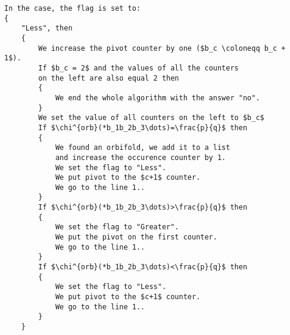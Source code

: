 \begin{lstlisting}[firstnumber=1,consecutivenumbers=true]
In the case, the flag is set to: 
{
    "Less", then 
    {
        We increase the pivot counter by one ($b_c \coloneqq b_c + 1$).
        If $b_c = 2$ and the values of all the counters 
        on the left are also equal 2 then 
        {
            We end the whole algorithm with the answer "no".
        }
        We set the value of all counters on the left to $b_c$
        If $\chi^{orb}(*b_1b_2b_3\dots)=\frac{p}{q}$ then
        {
            We found an orbifold, we add it to a list 
            and increase the occurence counter by 1. 
            We set the flag to "Less".
            We put pivot to the $c+1$ counter.
            We go to the line 1..
        }
        If $\chi^{orb}(*b_1b_2b_3\dots)>\frac{p}{q}$ then  
        {
            We set the flag to "Greater".
            We put the pivot on the first counter. 
            We go to the line 1..
        } 
        If $\chi^{orb}(*b_1b_2b_3\dots)<\frac{p}{q}$ then
        {
            We set the flag to "Less".
            We put pivot to the $c+1$ counter.
            We go to the line 1..
        } 
    }


\end{lstlisting}
